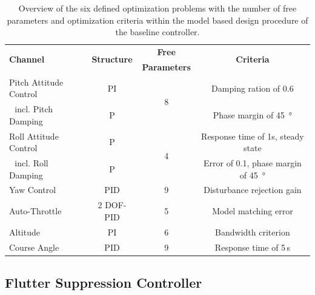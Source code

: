 \documentclass[aerospace,article,submit,moreauthors,pdftex,10pt,a4paper]{Definitions/mdpi}
\begin{document}
\begin{table}[H]
	\caption{Overview of the six defined optimization problems with the number of free parameters and optimization criteria within the model based design procedure of the baseline controller.}
	\centering
	\begin{tabular}{lccc}
		\toprule
		\multirow{2}{*}{\textbf{Channel} } & \multirow{2}{*}{\textbf{Structure} } &    \textbf{Free }    &   \multirow{2}{*}{\textbf{Criteria} }   \\
		                                   &                                      & \textbf{ Parameters} &                                         \\ \midrule
		Pitch Attitude Control             &                  PI                  &  \multirow{2}{*}{8}  &        Damping ration of 0.6          \\
		\,\, incl. Pitch Damping           &                  P                   &                      &         Phase margin of \SI{45}{\degree}         \\
		Roll Attitude Control              &                  P                   &  \multirow{2}{*}{4}  &   Response time of 1s, steady state   \\
		\,\, incl. Roll Damping            &                  P                   &                      & Error of 0.1, phase margin of \SI{45}{\degree} \\
		Yaw Control                        &                 PID                  &          9           &       Disturbance rejection gain        \\
		Auto-Throttle                      &              2 DOF-PID               &          5           &          Model matching error           \\
		Altitude                           &                  PI                  &          6           &           Bandwidth criterion           \\
		Course Angle                       &                 PID                  &          9           &          Response time of 5\,s          \\ \bottomrule
	\end{tabular}\label{tab:opt}
\end{table}



\subsection{Flutter Suppression Controller}
\end{document}
